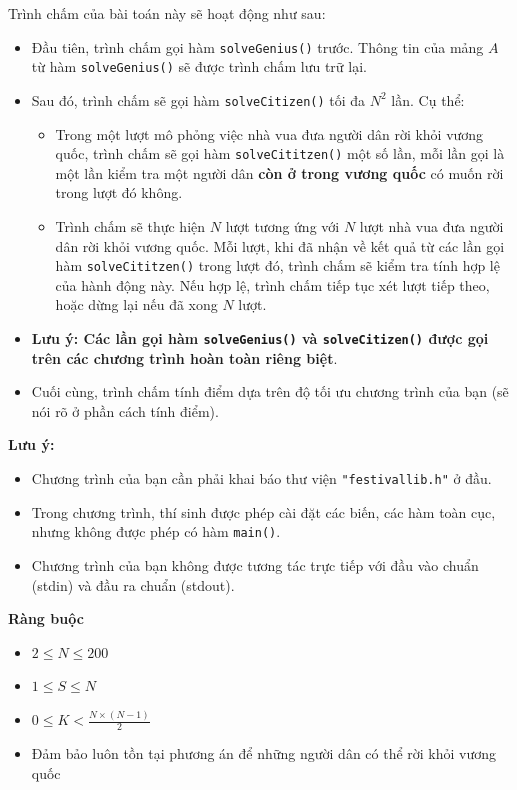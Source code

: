 Trình chấm của bài toán này sẽ hoạt động như sau:
\begin{itemize}
   \item Đầu tiên, trình chấm gọi hàm \texttt{solveGenius()} trước. Thông tin của mảng $A$ từ hàm \texttt{solveGenius()} sẽ được trình chấm lưu trữ lại.
   \item Sau đó, trình chấm sẽ gọi hàm \texttt{solveCitizen()} tối đa $N^2$ lần. Cụ thể:
   \begin{itemize}
      \item Trong một lượt mô phỏng việc nhà vua đưa người dân rời khỏi vương quốc, trình chấm sẽ gọi hàm \texttt{solveCititzen()} một số lần, mỗi lần gọi là một lần kiểm tra một người dân \textbf{còn ở trong vương quốc} có muốn rời trong lượt đó không.
      \item Trình chấm sẽ thực hiện $N$ lượt tương ứng với $N$ lượt nhà vua đưa người dân rời khỏi vương quốc. Mỗi lượt, khi đã nhận về kết quả từ các lần gọi hàm \texttt{solveCititzen()} trong lượt đó, trình chấm sẽ kiểm tra tính hợp lệ của hành động này. Nếu hợp lệ, trình chấm tiếp tục xét lượt tiếp theo, hoặc dừng lại nếu đã xong $N$ lượt.
   \end{itemize}
   \item \textbf{Lưu ý: Các lần gọi hàm \texttt{solveGenius()} và \texttt{solveCitizen()} được gọi trên các chương trình hoàn toàn riêng biệt}.
   \item Cuối cùng, trình chấm tính điểm dựa trên độ tối ưu chương trình của bạn (sẽ nói rõ ở phần cách tính điểm).
\end{itemize}

\textbf{Lưu ý:}
\begin{itemize}
   \item Chương trình của bạn cần phải khai báo thư viện \texttt{"festivallib.h"} ở đầu.
   \item Trong chương trình, thí sinh được phép cài đặt các biến, các hàm toàn cục, nhưng không được phép có hàm \texttt{main()}.
   \item Chương trình của bạn không được tương tác trực tiếp với đầu vào chuẩn (stdin) và đầu ra chuẩn (stdout).
\end{itemize}

\textbf{Ràng buộc}
\begin{itemize}
   \item $2\le N\le 200$
   \item $1\le S\le N$
   \item $0\le K<\frac{N\times (N-1)}2$
   \item Đảm bảo luôn tồn tại phương án để những người dân có thể rời khỏi vương quốc
\end{itemize}